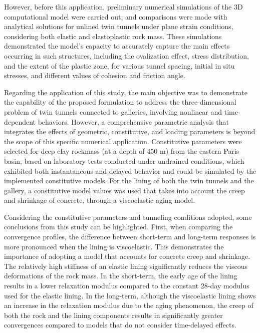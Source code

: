 \documentclass[a4paper,fleqn]{cas-sc}
\begin{document}
However, before this application, preliminary numerical simulations of the 3D computational model were carried out, and comparisons were made with analytical solutions for unlined twin tunnels under plane strain conditions, considering both elastic and elastoplastic rock mass. These simulations demonstrated the model's capacity to accurately capture the main effects occurring in such structures, including the ovalization effect, stress distribution, and the extent of the plastic zone, for various tunnel spacing, initial in situ stresses, and different values of cohesion and friction angle.

Regarding the application of this study, the main objective was to demonstrate the capability of the proposed formulation to address the three-dimensional problem of twin tunnels connected to galleries, involving nonlinear and time-dependent behaviors. However, a comprehensive parametric analysis that integrates the effects of geometric, constitutive, and loading parameters is beyond the scope of this specific numerical application. Constitutive parameters were selected for deep clay rockmass (at a depth of 450 m) from the eastern Paris basin, based on laboratory tests conducted under undrained conditions, which exhibited both instantaneous and delayed behavior and could be simulated by the implemented constitutive models. For the lining of both the twin tunnels and the gallery, a constitutive model values was used that takes into account the creep and shrinkage of concrete, through a viscoelastic aging model.

Considering the constitutive parameters and tunneling conditions adopted, some conclusions from this study can be highlighted. First, when comparing the convergence profiles, the difference between short-term and long-term responses is more pronounced when the lining is viscoelastic. This demonstrates the importance of adopting a model that accounts for concrete creep and shrinkage. The relatively high stiffness of an elastic lining significantly reduces the viscous deformations of the rock mass. In the short-term, the early age of the lining results in a lower relaxation modulus compared to the constant 28-day modulus used for the elastic lining. In the long-term, although the viscoelastic lining shows an increase in the relaxation modulus due to the aging phenomenon, the creep of both the rock and the lining components results in significantly greater convergences compared to models that do not consider time-delayed effects.
\end{document}
